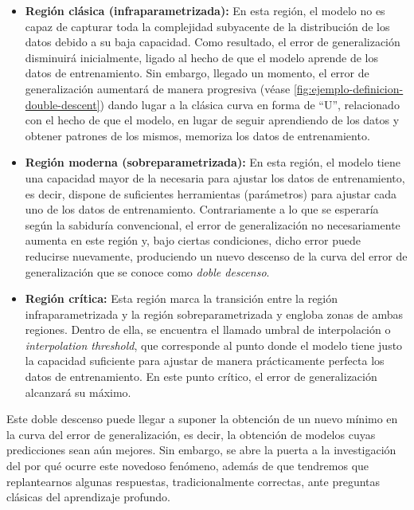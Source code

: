 \begin{itemize}
    \item \textbf{Región clásica (infraparametrizada):} En esta región, el modelo no es capaz de capturar toda la complejidad subyacente de la distribución de los datos debido a su baja capacidad. Como resultado, el error de generalización disminuirá inicialmente, ligado al hecho de que el modelo aprende de los datos de entrenamiento. Sin embargo, llegado un momento, el error de generalización aumentará de manera progresiva (véase \autoref{fig:ejemplo-definicion-double-descent}) dando lugar a la clásica curva en forma de ``U'', relacionado con el hecho de que el modelo, en lugar de seguir aprendiendo de los datos y obtener patrones de los mismos, memoriza los datos de entrenamiento.

    \item \textbf{Región moderna (sobreparametrizada):} En esta región, el modelo tiene una capacidad mayor de la necesaria para ajustar los datos de entrenamiento, es decir, dispone de suficientes herramientas (parámetros) para ajustar cada uno de los datos de entrenamiento. Contrariamente a lo que se esperaría según la sabiduría convencional, el error de generalización no necesariamente aumenta en este región y, bajo ciertas condiciones, dicho error puede reducirse nuevamente, produciendo un nuevo descenso de la curva del error de generalización que se conoce como \emph{doble descenso}.
    
    \item \textbf{Región crítica:} Esta región marca la transición entre la región infraparametrizada y la región sobreparametrizada y engloba zonas de ambas regiones. Dentro de ella, se encuentra el llamado umbral de interpolación o \textit{interpolation threshold}, que corresponde al punto donde el modelo tiene justo la capacidad suficiente para ajustar de manera prácticamente perfecta los datos de entrenamiento. En este punto crítico, el error de generalización alcanzará su máximo.\newline
       
\end{itemize}

Este doble descenso puede llegar a suponer la obtención de un nuevo mínimo en la curva del error de generalización, es decir, la obtención de modelos cuyas predicciones sean aún mejores. Sin embargo, se abre la puerta a la investigación del por qué ocurre este novedoso fenómeno, además de que tendremos que replantearnos algunas respuestas, tradicionalmente correctas, ante preguntas clásicas del aprendizaje profundo.\newline

